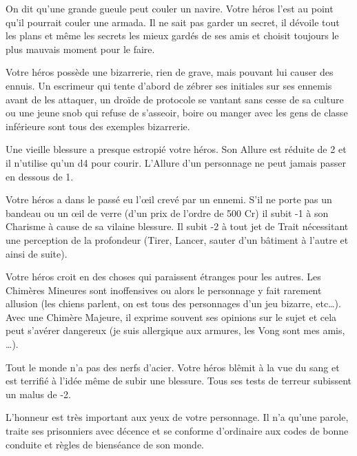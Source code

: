 \begin{description}[align=left]
    \item [Bavard (Mineur)]
        On dit qu’une grande gueule peut couler un navire. Votre héros l’est au point qu’il pourrait couler une armada. Il ne sait pas garder un secret, il dévoile tout les plans et même les secrets les mieux gardés de ses amis et choisit toujours le plus mauvais moment pour le faire.

    \item [Bizarrerie (Mineur)]
        Votre héros possède une bizarrerie, rien de grave, mais pouvant lui causer des ennuis. Un escrimeur qui tente d’abord de zébrer ses initiales sur ses ennemis avant de les attaquer, un droïde de protocole se vantant sans cesse de sa culture ou une jeune snob qui refuse de s’asseoir, boire ou manger avec les gens de classe inférieure sont tous des exemples bizarrerie.

    \item [Boiteux (Majeur)]
        Une vieille blessure a presque estropié votre héros. Son Allure est réduite de 2 et il n’utilise qu’un d4 pour courir. L’Allure d’un personnage ne peut jamais passer en dessous de 1.

    \item [Borgne (Majeur)]
        Votre héros a dans le passé eu l’\oe{il} crevé par un ennemi. S’il ne porte pas un bandeau ou un \oe{il} de verre (d’un prix de l’ordre de 500 Cr) il subit -1 à son Charisme à cause de sa vilaine blessure. Il subit -2 à tout jet de Trait nécessitant une perception de la profondeur (Tirer, Lancer, sauter d’un bâtiment à l’autre et ainsi de suite).

    \item [Chimères (Mineur ou Majeur)]
        Votre héros croit en des choses qui paraissent étranges pour les autres. Les Chimères Mineures sont inoffensives ou alors le personnage y fait rarement allusion (les chiens parlent, on est tous des personnages d’un jeu bizarre, etc\ldots).\\
        Avec une Chimère Majeure, il exprime souvent ses opinions sur le sujet et cela peut s’avérer dangereux (je suis allergique aux armures, les Vong sont mes amis, \ldots).

    \item [Couard (Majeur)]
        Tout le monde n’a pas des nerfs d’acier. Votre héros blêmit à la vue du sang et est terrifié à l’idée même de subir une blessure. Tous ses tests de terreur subissent un malus de -2.

    \item [Code d’Honneur (Majeur)]
        L’honneur est très important aux yeux de votre personnage. Il n’a qu’une parole, traite ses prisonniers avec décence et se conforme d’ordinaire aux codes de bonne conduite et règles de bienséance de son monde.


\end{description}
